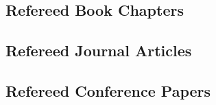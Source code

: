 \subsection{Refereed Book Chapters}
\begin{refsection}
\nocite{*}
\printbibliography[heading=none,sorting=ynt]
\end{refsection}

\subsection{Refereed Journal Articles}
\begin{refsection}
\nocite{*}
\printbibliography[heading=none,sorting=ynt]
\end{refsection}

\subsection{Refereed Conference Papers}
\begin{refsection}
\nocite{EduHPC22,ASE_2022,Scala_2019,kaylor_restfs_2011,DBLP:conf/iccl/ColbyJJLP98,DBLP:conf/coots/ColbyJJLP98,DBLP:conf/popl/OderskyL96}
\printbibliography[heading=none,sorting=ynt]
\end{refsection}
